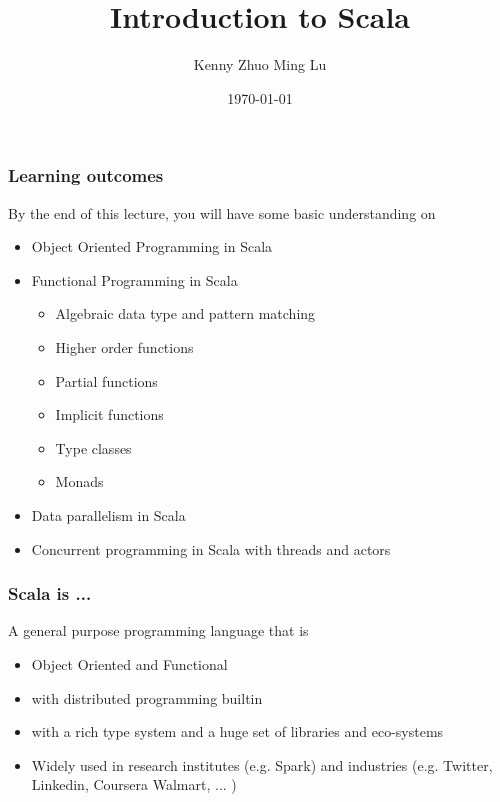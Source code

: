 \documentclass{beamer}
\begin{document}
\title{Introduction to Scala} 
\author{
 Kenny Zhuo Ming Lu
}
\date{\today} 


\frame{\titlepage} 

%

\begin{frame}[fragile]
\frametitle{Learning outcomes}
By the end of this lecture, you will have some basic understanding on
\begin{itemize}
 \item Object Oriented Programming in Scala
 \item Functional Programming in Scala
 \begin{itemize}
 \item Algebraic data type and pattern matching
 \item Higher order functions
 \item Partial functions
 \item Implicit functions
 \item Type classes
 \item Monads
\end{itemize}
 \item Data parallelism in Scala
 \item Concurrent programming in Scala with threads and actors
\end{itemize}
\end{frame}


\begin{frame}[fragile]
\frametitle{Scala is ... }

A general purpose programming language that is 
\begin{itemize}
 \item Object Oriented and Functional
 \item with distributed programming builtin
 \item with a rich type system and a huge set of libraries and eco-systems
 \item Widely used in research institutes (e.g. Spark) and industries
   (e.g. Twitter, Linkedin, Coursera Walmart, ... )
\end{itemize}
\end{frame}
\end{document}
